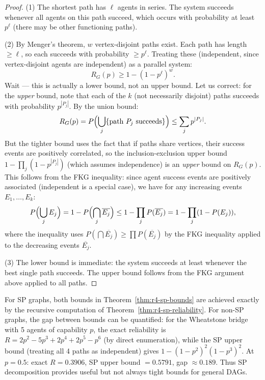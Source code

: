 \begin{proof}
(1) The shortest path has $\ell$ agents in series.  The system succeeds whenever
all agents on this path succeed, which occurs with probability at least $p^\ell$
(there may be other functioning paths).

(2) By Menger's theorem, $w$ vertex-disjoint paths exist.  Each path has length
$\ge \ell$, so each succeeds with probability $\ge p^\ell$.  Treating these
(independent, since vertex-disjoint agents are independent) as a parallel
system:
\[
  R_G(p) \ge 1 - (1-p^\ell)^w.
\]
Wait --- this is actually a lower bound, not an upper bound.  Let us correct: for
the \emph{upper} bound, note that each of the $k$ (not necessarily disjoint)
paths succeeds with probability $p^{|P_j|}$.  By the union bound:
\[
  R_G(p) = P\Bigl(\bigcup_j \{\text{path } P_j \text{ succeeds}\}\Bigr)
  \le \sum_j p^{|P_j|}.
\]
But the tighter bound uses the fact that if paths share vertices, their success
events are positively correlated, so the inclusion-exclusion upper bound
$1 - \prod_j(1 - p^{|P_j|})$ (which assumes independence) is an \emph{upper}
bound on $R_G(p)$.  This follows from the FKG inequality: since agent
success events are positively associated (independent is a special case), we have
for any increasing events $E_1, \ldots, E_k$:
\[
  P\Bigl(\bigcup_j E_j\Bigr) = 1 - P\Bigl(\bigcap_j \overline{E_j}\Bigr)
  \le 1 - \prod_j P(\overline{E_j}) = 1 - \prod_j (1 - P(E_j)),
\]
where the inequality uses $P(\bigcap \overline{E_j}) \ge \prod P(\overline{E_j})$
by the FKG inequality applied to the decreasing events $\overline{E_j}$.

(3) The lower bound is immediate: the system succeeds at least whenever the
best single path succeeds.  The upper bound follows from the FKG argument above
applied to all paths.
\end{proof}

\begin{remark}
\label{rmk:r4-sp-tightness}
For SP graphs, both bounds in Theorem~\ref{thm:r4-sp-bounds} are achieved
exactly by the recursive computation of Theorem~\ref{thm:r4-sp-reliability}.
For non-SP graphs, the gap between bounds can be quantified: for the
Wheatstone bridge with 5 agents of capability $p$, the exact reliability is
$R = 2p^2 - 5p^3 + 2p^4 + 2p^5 - p^6$ (by direct enumeration), while the
SP upper bound (treating all 4 paths as independent) gives
$1-(1-p^2)^2(1-p^3)^2$.  At $p = 0.5$: exact $R = 0.3906$, SP upper bound
$= 0.5791$, gap $\approx 0.189$.  Thus SP decomposition provides useful but
not always tight bounds for general DAGs.
\end{remark}

